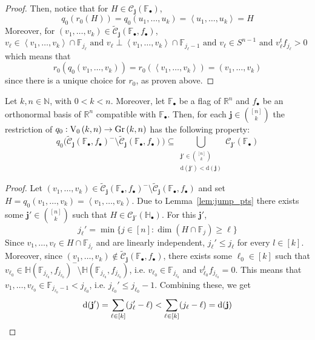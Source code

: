 \begin{proof}
Then, notice that for $H\in\mathcal{C}_{\mathbf{j}}(\mathbb{F}_{\bullet})$,
\[q_0(r_0(H))=q_0(u_1,\ldots,u_k)=\left<u_1,\ldots,u_k\right>=H\]
Moreover, for $(v_1,\ldots,v_k)\in\tilde{\mathcal{C}}_{\mathbf{j}}(\mathbb{F}_{\bullet},f_{\bullet})$,
$v_{\ell}\in\left<v_1,\ldots,v_k\right>\cap\mathbb{F}_{j_{\ell}}\text{ and } v_{\ell}\perp\left<v_1,\ldots,v_k\right>\cap\mathbb{F}_{j_{\ell}-1}\text{ and }v_{\ell}\in S^{n-1}\text{ and }v_{\ell}^tf_{j_{\ell}}>0$
which means that
\[r_0(q_0(v_1,\ldots,v_k))=r_0(\left<v_1,\ldots,v_k\right>)=(v_1,\ldots,v_k)\]
since there is a unique choice for $r_0$, as proven above.
\end{proof}

\begin{lemma}\label{lem:q0_on_bdr} Let $k,n\in\mathbb{N}$, with $0<k<n$. Moreover, let $\mathbb{F}_{\bullet}$ be a flag of $\mathbb{R}^n$ and $f_{\bullet}$ be an orthonormal basis of $\mathbb{R}^n$ compatible with $\mathbb{F}_{\bullet}$. Then, for each $\mathbf{j}\in\binom{[n]}{k}$ the restriction of $q_0:\StO{k}{n}\to\Gr{k}{n}$ has the following property:
\[q_0\big(\tilde{\mathcal{C}}_{\mathbf{j}}(\mathbb{F}_{\bullet},f_{\bullet})^-\setminus\tilde{\mathcal{C}}_{\mathbf{j}}(\mathbb{F}_{\bullet},f_{\bullet})\big)\subseteq\bigcup_{\substack{\mathbf{j}'\in\binom{[n]}{k}\\\mathrm{d}(\mathbf{j}')<\mathrm{d}(\mathbf{j})}}\mathcal{C}_{\mathbf{j}'}(\mathbb{F}_{\bullet})\]
\end{lemma}
\begin{proof} Let $(v_1,\ldots,v_k)\in\tilde{\mathcal{C}}_{\mathbf{j}}(\mathbb{F}_{\bullet},f_{\bullet})^-\setminus\tilde{\mathcal{C}}_{\mathbf{j}}(\mathbb{F}_{\bullet},f_{\bullet})$ and set $H=q_0(v_1,\ldots,v_k)=\left<v_1,\ldots,v_k\right>$. Due to Lemma~\ref{lem:jump_pts} there exists some $\mathbf{j}'\in\binom{[n]}{k}$ such that $H\in\mathcal{C}_{\mathbf{j}'}(\mathbb{H}_{\bullet})$. For this $\mathbf{j}'$,
\[j_{\ell}'=\min\{j\in[n]:\dim(H\cap\mathbb{F}_j)\geq\ell\}\]
Since $v_1,\ldots,v_{\ell}\in H\cap\mathbb{F}_{j_{\ell}}$ and are linearly independent, $j_{\ell}'\leq j_{\ell}$ for every $l\in[k]$. Moreover, since $(v_1,\ldots,v_k)\not\in\tilde{\mathcal{C}}_{\mathbf{j}}(\mathbb{F}_{\bullet},f_{\bullet})$, there exists some $\ell_0\in[k]$ such that $v_{\ell_0}\in\mathbb{H}(\mathbb{F}_{j_{\ell_0}},f_{j_{\ell_0}})^-\setminus\mathbb{H}(\mathbb{F}_{j_{\ell_0}},f_{j_{\ell_0}})$, i.e. $v_{\ell_0}\in\mathbb{F}_{j_{\ell_0}}$ and $v_{\ell_0}^tf_{j_{\ell_0}}=0$. This means that $v_1,\ldots,v_{\ell_0}\in\mathbb{F}_{j_{\ell_0}-1}<j_{\ell_0}$, i.e. $j_{\ell_0}'\leq j_{\ell_0}-1$. Combining these, we get
\[\mathrm{d}(\mathbf{j}')=\sum_{\ell\in[k]}(j'_{\ell}-\ell)<\sum_{\ell\in[k]}(j_{\ell}-\ell)=\mathrm{d}(\mathbf{j})\qedhere\]
\end{proof}

